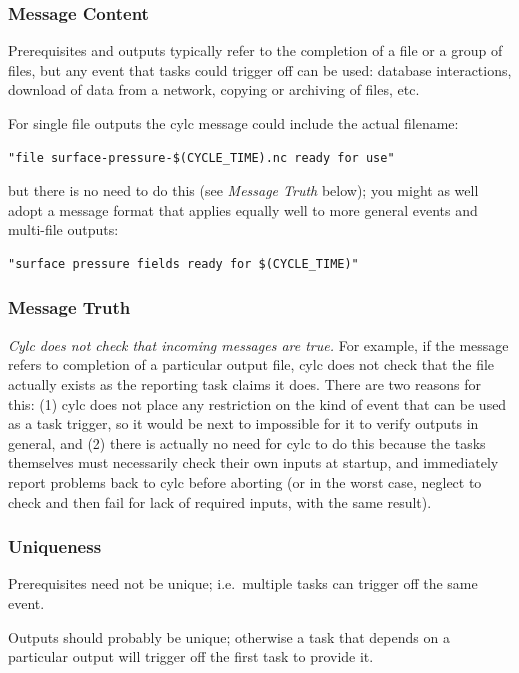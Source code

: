 \documentclass[11pt,a4paper]{article}
\begin{document}
\subsubsection{Message Content}

Prerequisites and outputs typically refer to the completion of a file
or a group of files, but any event that tasks could trigger off can be
used: database interactions, download of data from a network, copying
or archiving of files, etc.

For single file outputs the cylc message could include the actual
filename:
\begin{lstlisting}
"file surface-pressure-$(CYCLE_TIME).nc ready for use"
\end{lstlisting}
but there is no need to do this (see {\em Message Truth} below); you
might as well adopt a message format that applies equally well to
more general events and multi-file outputs:
\begin{lstlisting}
"surface pressure fields ready for $(CYCLE_TIME)"
\end{lstlisting}


\subsubsection{Message Truth}

{\em Cylc does not check that incoming messages are true.}  For example,
if the message refers to completion of a particular output file, cylc
does not check that the file actually exists as the reporting task
claims it does. There are two reasons for this: (1) cylc does not place
any restriction on the kind of event that can be used as a task trigger,
so it would be next to impossible for it to verify outputs in general,
and (2) there is actually no need for cylc to do this because the tasks
themselves must necessarily check their own inputs at startup, and
immediately report problems back to cylc before aborting (or in the
worst case, neglect to check and then fail for lack of required inputs,
with the same result).


\subsubsection{Uniqueness}

Prerequisites need not be unique; i.e.\ multiple tasks can trigger off
the same event.

Outputs should probably be unique; otherwise a task that depends on a
particular output will trigger off the first task to provide it.
\end{document}
